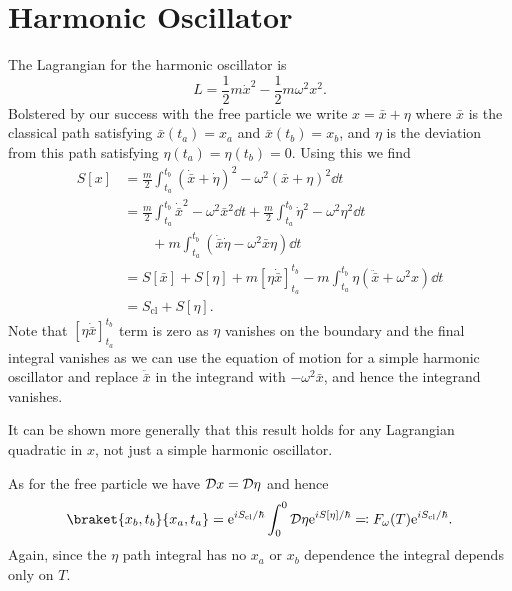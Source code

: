\documentclass[fleqn]{NotesClass}
\newcommand*{\e}{\mathrm{e}}
\newcommand*{\lagrangian}{L}
\newcommand*{\cl}{\mathrm{cl}}
\begin{document}
    \section{Harmonic Oscillator}
    The Lagrangian for the harmonic oscillator is
    \begin{equation}
        \lagrangian = \frac{1}{2}m\dot{x}^2 - \frac{1}{2}m\omega^2x^2.
    \end{equation}
    Bolstered by our success with the free particle we write \(x = \bar{x} + \eta\) where \(\bar{x}\) is the classical path satisfying \(\bar{x}(t_a) = x_a\) and \(\bar{x}(t_b) = x_b\), and \(\eta\) is the deviation from this path satisfying \(\eta(t_a) = \eta(t_b) = 0\).
    Using this we find
    \begin{align}
        S[x] &= \frac{m}{2}\int_{t_a}^{t_b} (\dot{\bar{x}} + \dot{\eta})^2 - \omega^2(\bar{x} + \eta)^2\dd{t}\\
        &= \frac{m}{2}\int_{t_a}^{t_b} \dot{\bar{x}}^2 - \omega^2 \bar{x}^2 \dd{t} + \frac{m}{2}\int_{t_a}^{t_b} \dot{\eta}^2- \omega^2\eta^2 \dd{t}\\
        &\qquad+ m\int_{t_a}^{t_b} (\dot{\bar{x}}\dot{\eta} - \omega^2\bar{x}\eta) \dd{t}\\
        &= S[\bar{x}] + S[\eta] + m[\eta\dot{\bar{x}}]_{t_a}^{t_b} - m\int_{t_a}^{t_b} \eta(\ddot{\bar{x}} + \omega^2 x) \dd{t}\\
        &= S_{\cl} + S[\eta].
    \end{align}
    Note that \([\eta\dot{\bar{x}}]_{t_a}^{t_b}\) term is zero as \(\eta\) vanishes on the boundary and the final integral vanishes as we can use the equation of motion for a simple harmonic oscillator and replace \(\ddot{\bar{x}}\) in the integrand with \(-\omega^2\bar{x}\), and hence the integrand vanishes.
    
    It can be shown more generally that this result holds for any Lagrangian quadratic in \(x\), not just a simple harmonic oscillator.
    
    As for the free particle we have \(\DL{x} = \DL{\eta}\) and hence
    \begin{equation}
        \braket{x_b, t_b}{x_a, t_a} = \e^{iS_{\cl}/\hbar} \int_0^0 \DL{\eta} \e^{iS[\eta]/\hbar} \eqqcolon F_{\omega}(T)\e^{iS_{\cl}/\hbar}.
    \end{equation}
    Again, since the \(\eta\) path integral has no \(x_a\) or \(x_b\) dependence the integral depends only on \(T\).
    
\end{document}
